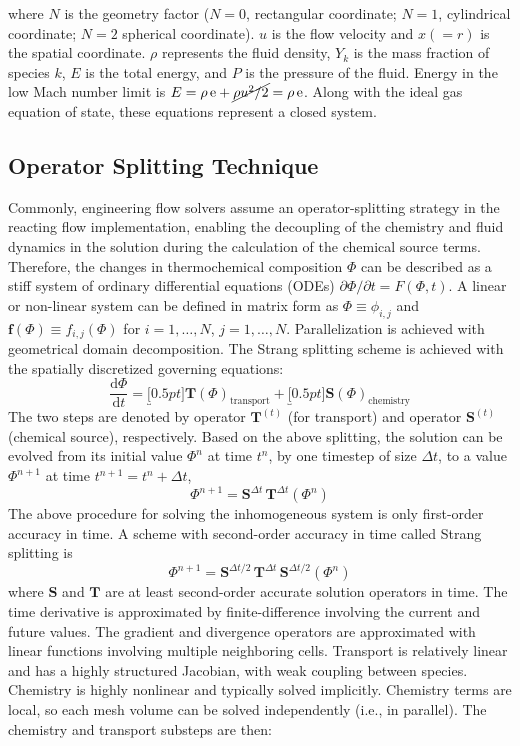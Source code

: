 \documentclass[letterpaper,twocolumn,10pt]{article}
\begin{document}
where $N$ is the geometry factor ($N=0$, rectangular coordinate; $N=1$, cylindrical coordinate; $N=2$ spherical coordinate). $u$ is the flow velocity and $x(=r)$ is the spatial coordinate. $\rho$ represents the fluid density, $Y_k$ is the mass fraction of species $k$, $E$ is the total energy, and $P$ is the pressure of the fluid. Energy in the low Mach number limit is $E = \rho \, \textrm{e} + \cancel{\rho u^2 / 2} = \rho \, \textrm{e}$. Along with the ideal gas equation of state, these equations represent a closed system.

\subsection{Operator Splitting Technique}
Commonly, engineering flow solvers assume an operator-splitting strategy in the reacting flow implementation, enabling the decoupling of the chemistry and fluid dynamics in the solution during the calculation of the chemical source terms. Therefore, the changes in thermochemical composition $\Phi$ can be described as a stiff system of ordinary differential equations (ODEs) $\partial \Phi / \partial t = F(\Phi, t)$. A linear or non-linear system can be defined in matrix form as $\Phi \equiv \phi_{i,j} $ and $\mathbf{f}(\Phi) \equiv f_{i,j} (\Phi)$ for $ i= 1, \dots, N $, $ j= 1, \dots, N $. Parallelization is achieved with geometrical domain decomposition. The Strang splitting scheme is achieved with the spatially discretized governing equations:
$$\frac{\textrm{d} \Phi}{\textrm{d} t} = \underbracket[0.5pt]{\mathbf{T}(\Phi)}_{\textrm{transport}} + \underbracket[0.5pt]{\mathbf{S}(\Phi)}_{\textrm{chemistry}} $$
The two steps are denoted by operator $\textbf{T}^{(t)}$ (for transport) and operator $\textbf{S}^{(t)}$ (chemical source), respectively. Based on the above splitting, the solution can be evolved from its initial value $\Phi^n$ at time $t^n$, by one timestep of size $\Delta t$, to a value $\Phi^{n+1}$ at time
$t^{n+1} = t^n + \Delta t$,
$$\Phi^{n+1} = \textbf{S}^{\Delta t} \, \textbf{T}^{\Delta t} (\Phi^n)$$
The above procedure for solving the inhomogeneous system is only first-order accuracy in time. A scheme with second-order accuracy in time called Strang splitting is 
$$\Phi^{n+1} = \textbf{S}^{\Delta t / 2} \, \textbf{T}^{\Delta t} \, \textbf{S}^{\Delta t / 2} (\Phi^n)$$
where $\textbf{S}$ and $\textbf{T}$ are at least second-order accurate solution operators in time. The time derivative is approximated by finite-difference involving the current and future values. The gradient and divergence operators are approximated with linear functions involving multiple neighboring cells. Transport is relatively linear and has a highly structured Jacobian, with weak coupling between species. Chemistry is highly nonlinear and typically solved implicitly. Chemistry terms are local, so each mesh volume can be solved independently (i.e., in parallel). The chemistry and transport substeps are then:
\end{document}
